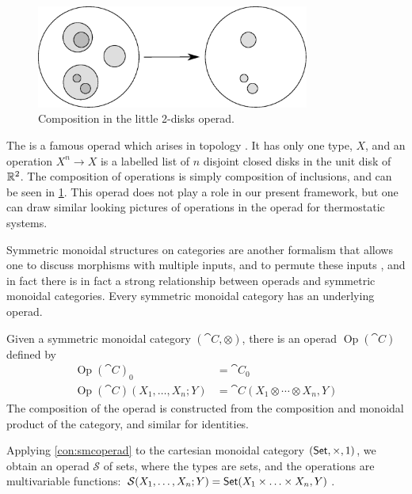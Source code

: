 \documentclass[12pt, reqno]{amsart}
\DeclareMathOperator{\Op}{Op}
\newcommand{\C}{\cat{C}}
\begin{document}
\begin{figure}
    \centering
    \includegraphics[width=0.8\textwidth]{figures/little_2disks_composition.eps}
    \caption{Composition in the little 2-disks operad.}
    \label{fig:little_2disks_composition}
\end{figure}

\begin{example}
    The  is a famous operad which arises in topology  \cite{Sinha}. It has only one type, $X$, and an operation $X^n \to X$ is a labelled list of $n$ disjoint closed disks in the unit disk of $\mathbb{R}^2$. The composition of operations is simply composition of inclusions, and can be seen in \cref{fig:little_2disks_composition}. This operad does not play a role in our present framework, but one can draw similar looking pictures of operations in the operad for thermostatic systems.
\end{example}

Symmetric monoidal structures on categories are another formalism that allows one to discuss morphisms with multiple inputs, and to permute these inputs \cite{MacLane}, and in fact there is in fact a strong relationship between operads and symmetric monoidal categories. Every symmetric monoidal category has an underlying operad.

\begin{construction}
\label{con:smcoperad}
    Given a symmetric monoidal category $(\C, \otimes)$, there is an operad $\Op(\C)$ defined by
    \begin{align*}
        \Op(\C)_0 &= \C_0 \\
        \Op(\C)(X_1, \ldots, X_n; Y) &= \C(X_1 \otimes \cdots \otimes X_n, Y)
    \end{align*}
    The composition of the operad is constructed from the composition and monoidal product of the category, and similar for identities.
\end{construction}

\begin{example} \label{ex:operad_of_sets}
 Applying \cref{con:smcoperad} to the cartesian monoidal category $(\mathsf{Set}, \times, 1)$, we obtain an operad $\mathcal{S}$ of sets, where the types are sets, and the operations are multivariable functions: $\mathcal{S}(X_1, \ldots, X_n; Y) = \mathsf{Set}(X_1 \times \ldots \times X_n, Y)$.
\end{example}
\end{document}
